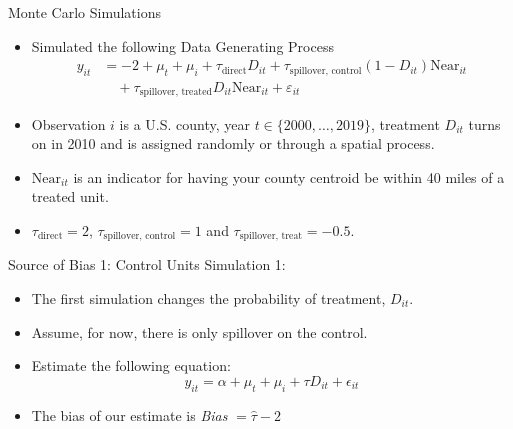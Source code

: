\documentclass[aspectratio=43]{beamer}
\begin{document}
\begin{frame}{Monte Carlo Simulations}
    \begin{itemize}
        \item Simulated the following Data Generating Process \begin{align*}
            y_{it} &= -2 + \mu_t + \mu_i + \tau_{\text{direct}} D_{it} + \tau_{\text{spillover, control}} (1-D_{it}) \text{Near}_{it} \\ 
            &\quad + \tau_{\text{spillover, treated}} D_{it} \text{Near}_{it} + \varepsilon_{it}
        \end{align*}

        \item Observation $i$ is a U.S. county, year $t \in \{2000, \dots, 2019\}$, treatment $D_{it}$ turns on in 2010 and is assigned randomly or through a spatial process.
        
        \item $\text{Near}_{it}$ is an indicator for having your county centroid be within 40 miles of a treated unit. 
        
        \item $\tau_{\text{direct}} = 2$, $\tau_{\text{spillover, control}} = 1$ and $\tau_{\text{spillover, treat}} = -0.5$.
    \end{itemize}
\end{frame}

\begin{frame}{Source of Bias 1: Control Units}
    Simulation 1: 
    
    \begin{itemize}
        \item The first simulation changes the probability of treatment, $D_{it}$.
        
        \item Assume, for now, there is only spillover on the control.
        
        \item Estimate the following equation: \[ 
            y_{it} = \alpha + \mu_t + \mu_i + \tau D_{it} + \epsilon_{it}    
        \]
        
        \item The bias of our estimate is \textit{Bias} $= \hat{\tau} - 2$
    \end{itemize}


    
\end{frame}

\end{document}
